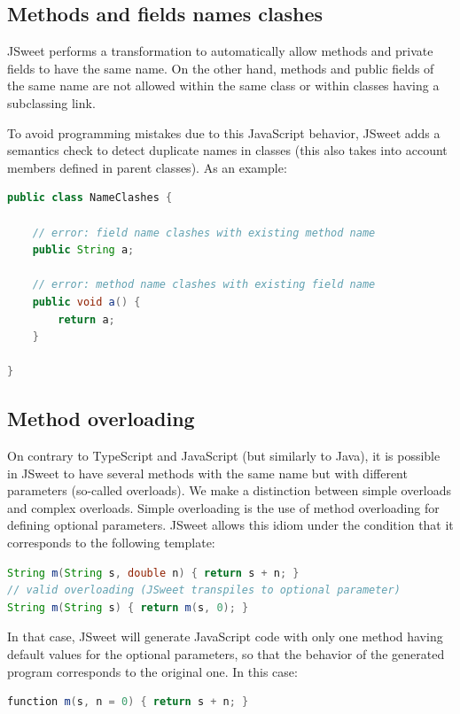 \documentclass[a4paper]{report}
\begin{document}
\subsection{Methods and fields names clashes}

JSweet performs a transformation to automatically allow methods and private fields to have the same name. On the other hand, methods and public fields of the same name are not allowed within the same class or within classes having a subclassing link. 

To avoid programming mistakes due to this JavaScript behavior, JSweet adds a semantics check to detect duplicate names in classes (this also takes into account members defined in parent classes). As an example:

\begin{lstlisting}[language=Java]
public class NameClashes {

	// error: field name clashes with existing method name
	public String a;

	// error: method name clashes with existing field name
	public void a() {
		return a;
	}

}
\end{lstlisting}

\subsection{Method overloading}

On contrary to TypeScript and JavaScript (but similarly to Java), it is possible in JSweet to have several methods with the same name but with different parameters (so-called overloads). We make a distinction between simple overloads and complex overloads. Simple overloading is the use of method overloading for defining optional parameters. JSweet allows this idiom under the condition that it corresponds to the following template:

\begin{lstlisting}[language=Java]
String m(String s, double n) { return s + n; }
// valid overloading (JSweet transpiles to optional parameter)
String m(String s) { return m(s, 0); }
\end{lstlisting}

In that case, JSweet will generate JavaScript code with only one method having default values for the optional parameters, so that the behavior of the generated program corresponds to the original one. In this case:

\begin{lstlisting}[language=Java]
function m(s, n = 0) { return s + n; }
\end{lstlisting}
\end{document}
